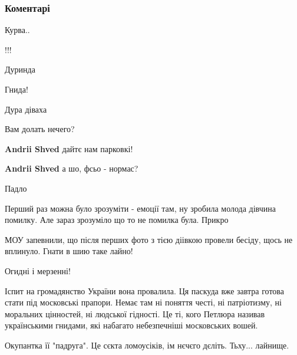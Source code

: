  
 
 
 
 
\subsubsection{Коментарі}
\label{sec:09_09_2021.fb.shevchuk_vladislav.1.maguchih_lasickene_foto.cmt}

\begin{itemize} %
Курва..

!!!

Дуринда

Гнида!

Дура діваха

Вам долать нечего?

\begin{itemize} %
\textbf{Andrii Shved} дайтє нам парковкі!

\textbf{Andrii Shved} а шо, фсьо - нормас?
\end{itemize} %

Падло

Перший раз можна було зрозуміти - емоції там, ну зробила молода дівчина помилку.
Але зараз зрозуміло що то не помилка була. Прикро

МОУ запевнили, що після перших фото з тією діівкою провели бесіду, щось не вплинуло. Гнати в шию таке лайно!

Огидні і мерзенні!

Іспит на громадянство України вона провалила.
Ця паскуда вже завтра готова стати під московські прапори.
Немає там ні поняття честі, ні патріотизму, ні моральних цінностей, ні людської гідності.
Це ті, кого Петлюра називав українськими гнидами, які набагато небезпечніші московських вошей.

Окупантка її "падруга". Це сєкта ломоусіків, ім нєчєго дєліть. Тьху... лайнище.


\end{itemize}
